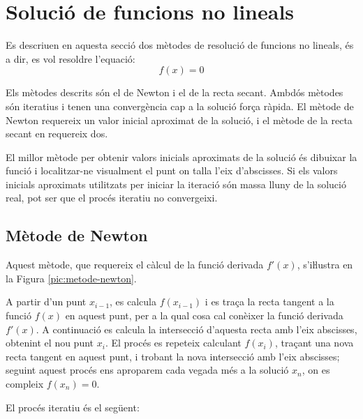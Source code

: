 \section{Solució de funcions no lineals}\label{sec:func-no-lin}

Es descriuen en aquesta secció dos mètodes de resolució de funcions no lineals, és a dir, es vol resoldre l'equació: \begin{equation}
   f(x) = 0 \end{equation}

Els mètodes descrits són el de Newton i el de la recta secant. Ambdós mètodes són iteratius i tenen una convergència cap a la solució força ràpida. El mètode de Newton requereix un valor inicial aproximat de la solució, i el mètode de la recta secant en requereix dos.

El millor mètode per obtenir valors inicials aproximats de la solució és dibuixar la funció i localitzar-ne visualment el punt on talla l'eix d'abscisses. Si els valors inicials aproximats utilitzats per iniciar la iteració són massa lluny de la solució real, pot ser que el procés iteratiu no convergeixi.


\subsection{Mètode de Newton}

Aquest mètode, que requereix el càlcul de la funció derivada $f'(x)$, s'iŀlustra en la Figura \vref{pic:metode-newton}.

A partir d'un punt $x_{i-1}$, es calcula $f(x_{i-1})$ i es traça la recta tangent a la funció $f(x)$ en aquest punt, per a la qual cosa cal conèixer la funció derivada $f'(x)$. A continuació es calcula la intersecció d'aquesta recta amb l'eix abscisses, obtenint el nou punt $x_i$. El procés es repeteix calculant $f(x_i)$, traçant una nova recta tangent en aquest punt, i trobant la nova intersecció amb l'eix abscisses; seguint aquest procés ens aproparem cada vegada més a la solució $x_n$, on es compleix $f(x_n)=0$.

\begin{center}
    
    \label{pic:metode-newton}
\end{center}

El procés iteratiu és el següent:

